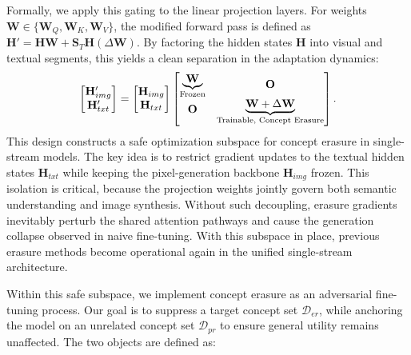 Formally, we apply this gating to the linear projection layers. For weights $\mathbf{W} \in \{\mathbf{W}_Q, \mathbf{W}_K, \mathbf{W}_V\}$, the modified forward pass is defined as $\mathbf{H}' = \mathbf{H} \mathbf{W} + \mathbf{S}_T \mathbf{H} (\Delta \mathbf{W})$. By factoring the hidden states $\mathbf{H}$ into visual and textual segments, this yields a clean separation in the adaptation dynamics:
\begin{equation}
\begin{aligned}
\begin{bmatrix} \mathbf{H}_{img}' \\ \mathbf{H}_{txt}' \end{bmatrix}
=
\begin{bmatrix} \mathbf{H}_{img} \\ \mathbf{H}_{txt} \end{bmatrix}
\begin{bmatrix}
\underbrace{\mathbf{W}}_{\text{Frozen}} 
& \raisebox{-5pt}{$\mathbf{O}$}\\[2pt]
\raisebox{-5pt}{$\mathbf{O}$}
& \underbrace{\mathbf{W} + \Delta \mathbf{W}}_{\text{Trainable, Concept Erasure}}
\end{bmatrix}.
\end{aligned}
\label{eq: Stream Disentangled Concept Erasure Framework}
\end{equation}
This design constructs a safe optimization subspace for concept erasure in single-stream models. The key idea is to restrict gradient updates to the textual hidden states $\mathbf{H}_{txt}$ while keeping the pixel-generation backbone $\mathbf{H}_{img}$ frozen. This isolation is critical, because the projection weights jointly govern both semantic understanding and image synthesis. Without such decoupling, erasure gradients inevitably perturb the shared attention pathways and cause the generation collapse observed in naive fine-tuning. With this subspace in place, previous erasure methods become operational again in the unified single-stream architecture.




Within this safe subspace, we implement concept erasure as an adversarial fine-tuning process. Our goal is to suppress a target concept set $\mathcal{D}_{er}$, while anchoring the model on an unrelated concept set $\mathcal{D}_{pr}$ to ensure general utility remains unaffected. The two objects are defined as:


